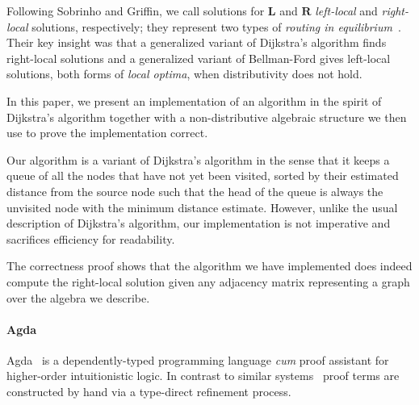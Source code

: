 
Following Sobrinho and Griffin, we call solutions for \(\mathbf{L}\) and \(\mathbf{R}\) \emph{left-local} and \emph{right-local} solutions, respectively; they represent two types of \emph{routing in equilibrium}~\cite{sobrinho_routing_2010}. Their key insight was that a generalized variant of Dijkstra's algorithm finds right-local solutions and a generalized variant of Bellman-Ford gives left-local solutions, both forms of \emph{local optima}, when distributivity does not hold.

In this paper, we present an implementation of an algorithm in the spirit of Dijkstra's algorithm together with a non-distributive algebraic structure we then use to prove the implementation correct.

Our algorithm is a variant of Dijkstra's algorithm in the sense that it keeps a queue of all the nodes that have not yet been visited, sorted by their estimated distance from the source node such that the head of the queue is always the unvisited node with the minimum distance estimate. However, unlike the usual description of Dijkstra's algorithm, our implementation is not imperative and sacrifices efficiency for readability.

The correctness proof shows that the algorithm we have implemented does indeed compute the right-local solution given any adjacency matrix representing a graph over the algebra we describe.

\paragraph{Agda}

Agda~\cite{norell_dependently_2009} is a dependently-typed programming language \emph{cum} proof assistant for higher-order intuitionistic logic.
In contrast to similar systems~\cite{bertot_short_2008,asperti_matita_2011} proof terms are constructed by hand via a type-direct refinement process.

